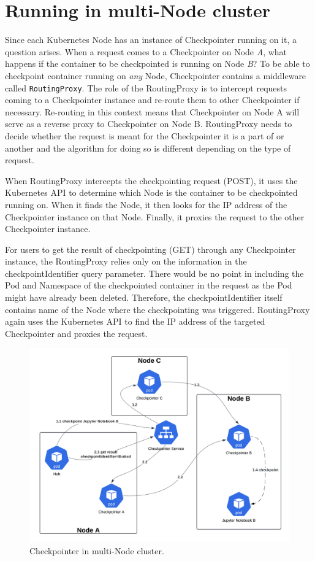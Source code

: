 \documentclass[
  digital,     %
  oneside,     %
  nosansbold,  %
  nocolorbold, %
  lof,         %
  nolot,         %
]{fithesis4}
\begin{document}
\section{Running in multi-Node cluster}
Since each Kubernetes Node has an instance of Checkpointer running on it, a question arises. When a request comes to a Checkpointer on Node \emph{A}, what happens if the container to be checkpointed is running on Node \emph{B}? To be able to checkpoint container running on \emph{any} Node, Checkpointer contains a middleware called \texttt{RoutingProxy}. The role of the RoutingProxy is to intercept requests coming to a Checkpointer instance and re-route them to other Checkpointer if necessary. Re-routing in this context means that Checkpointer on Node A will serve as a reverse proxy to Checkpointer on Node B. RoutingProxy needs to decide whether the request is meant for the Checkpointer it is a part of or another and the algorithm for doing so is different depending on the type of request.

When RoutingProxy intercepts the checkpointing request (POST), it uses the Kubernetes API to determine which Node is the container to be checkpointed running on. When it finds the Node, it then looks for the IP address of the Checkpointer instance on that Node. Finally, it proxies the request to the other Checkpointer instance.

For users to get the result of checkpointing (GET) through any Checkpointer instance, the RoutingProxy relies only on the information in the checkpointIdentifier query parameter. There would be no point in including the Pod and Namespace of the checkpointed container in the request as the Pod might have already been deleted. Therefore, the checkpointIdentifier itself contains name of the Node where the checkpointing was triggered. RoutingProxy again uses the Kubernetes API to find the IP address of the targeted Checkpointer and proxies the request.

\begin{figure}[H]
  \begin{center}
  \includegraphics[width=\textwidth]{figures/multi-cluster-checkpoint.png}
  \end{center}
  \caption{Checkpointer in multi-Node cluster.}
  \label{fig:multi-cluster-checkpoint}
\end{figure}
\end{document}
